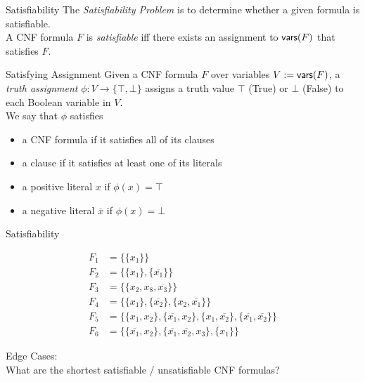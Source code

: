 \documentclass[t]{sdqbeamer}
\begin{document}
\begin{frame}{Satisfiability}
	The \emph{Satisfiability Problem} is to determine whether a given formula is satisfiable.\\
	A CNF formula $F$ is \emph{satisfiable} iff there exists an assignment to $\textsf{vars}(F)$ that satisfies $F$.
	\begin{block}{Satisfying Assignment}
		Given a CNF formula $F$ over variables $V := \textsf{vars}(F)$, a \emph{truth assignment} $\phi : V \rightarrow \{ \top, \bot \}$ assigns a truth value $\top$ (True) or $\bot$ (False) to each Boolean variable in $V$.\\[1em]
		We say that $\phi$ satisfies
			\begin{itemize}
				\item a CNF formula if it satisfies all of its clauses
				\item a clause if it satisfies at least one of its literals
				\item a positive literal $x$ if $\phi(x)=\top$
				\item a negative literal $\overline{x}$ if $\phi(x)=\bot$
			\end{itemize}
	\end{block}
\end{frame}

\begin{frame}{Satisfiability}
\begin{example}
	\vspace*{-3ex}
	\begin{align*}
		F_1 &= \{ \{ x_1 \} \}\\[1ex]
		F_2 &= \{ \{ x_1 \}, \{ \overline{x_1} \} \}\\[1ex]
		F_3 &= \{ \{ x_2, x_8, \overline{x_3} \} \}\\[1ex]
		F_4 &= \{ \{ x_1 \}, \{ \overline{x_2} \}, \{ x_2, \overline{x_1} \} \}\\[1ex]
		F_5 &= \{ \{ x_1, x_2 \}, \{ \overline{x_1}, x_2 \}, \{ x_1, \overline{x_2} \}, \{ \overline{x_1}, \overline{x_2} \} \}\\[1ex]
		F_6 &= \{ \{ \overline{x_1}, x_2 \}, \{ \overline{x_1}, \overline {x_2}, x_3 \}, \{ x_1 \} \}
	\end{align*}
\end{example}
\pause
\begin{alert}{Edge Cases:\\}
	What are the shortest satisfiable / unsatisfiable CNF formulas?
\end{alert}
\end{frame}
\end{document}
